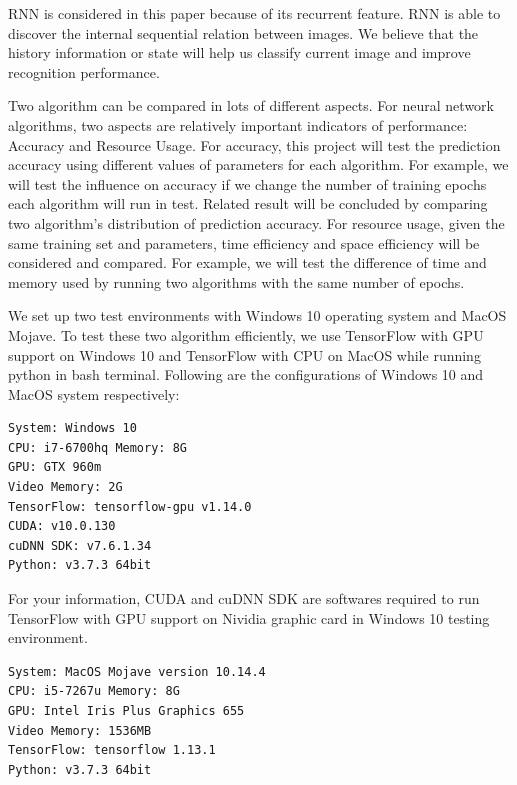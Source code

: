 \documentclass[letterpaper]{article} %
\begin{document}
RNN is considered in this paper because of its recurrent feature. RNN is able to discover the internal sequential relation between images. We believe that the history information or state will help us classify current image and improve recognition performance.

Two algorithm can be compared in lots of different aspects. For neural network algorithms, two aspects are relatively important indicators of performance: Accuracy and Resource Usage. For accuracy, this project will test the prediction accuracy using different values of parameters for each algorithm. For example, we will test the influence on accuracy if we change the number of training epochs each algorithm will run in test. Related result will be concluded by comparing two algorithm’s distribution of prediction accuracy. For resource usage, given the same training set and parameters, time efficiency and space efficiency will be considered and compared. For example, we will test the difference of time and memory used by running two algorithms with the same number of epochs.

We set up two test environments with Windows 10 operating system and MacOS Mojave. To test these two algorithm efficiently, we use TensorFlow with GPU support on Windows 10 and TensorFlow with CPU on MacOS while running python in bash terminal. Following are the configurations of Windows 10 and MacOS system respectively:
\begin{lstlisting}[columns=fullflexible, keepspaces=true, stepnumber=1]
System: Windows 10
CPU: i7-6700hq Memory: 8G
GPU: GTX 960m 
Video Memory: 2G
TensorFlow: tensorflow-gpu v1.14.0
CUDA: v10.0.130
cuDNN SDK: v7.6.1.34
Python: v3.7.3 64bit
\end{lstlisting}
For your information, CUDA and cuDNN SDK are softwares required to run TensorFlow with GPU support on Nividia graphic card in Windows 10 testing environment.
\begin{lstlisting}[columns=fullflexible, keepspaces=true, stepnumber=1]
System: MacOS Mojave version 10.14.4
CPU: i5-7267u Memory: 8G
GPU: Intel Iris Plus Graphics 655 
Video Memory: 1536MB
TensorFlow: tensorflow 1.13.1
Python: v3.7.3 64bit
\end{lstlisting}

\end{document}
